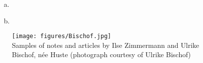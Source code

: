 \documentclass[output=paper,colorlinks,citecolor=brown]{langscibook}
\begin{document}
{\begin{enumerate}[leftmargin=*]
\item[a.] 

\item[b.] 

\end{enumerate}


\begin{enumerate}[leftmargin=*]

\item[] 

\end{enumerate}


\begin{enumerate}[leftmargin=*]

\item[] 

\end{enumerate}


\begin{enumerate}[leftmargin=*]

\item[] 

\end{enumerate}}

\vfill
\begin{figure}
    \texttt{[image: figures/Bischof.jpg]}\\
    {\small Samples of notes and articles by Ilse Zimmermann and Ulrike Bischof, née Huste (photograph courtesy of Ulrike Bischof)}%
\end{figure}
\vfill
~
\end{document}
